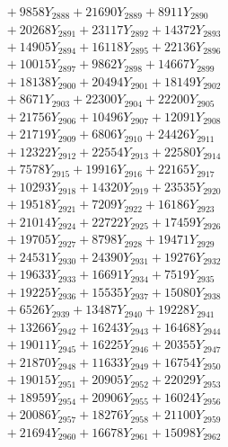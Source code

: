 \documentclass[a4paper,10pt]{article}
\begin{document}
{\begin{align}
&\;  + 9858 Y_{2888} + 21690 Y_{2889} + 8911 Y_{2890} \\[0.3ex]
&\;  + 20268 Y_{2891} + 23117 Y_{2892} + 14372 Y_{2893} \\[0.3ex]
&\;  + 14905 Y_{2894} + 16118 Y_{2895} + 22136 Y_{2896} \\[0.3ex]
&\;  + 10015 Y_{2897} + 9862 Y_{2898} + 14667 Y_{2899} \\[0.3ex]
&\;  + 18138 Y_{2900} + 20494 Y_{2901} + 18149 Y_{2902} \\[0.3ex]
&\;  + 8671 Y_{2903} + 22300 Y_{2904} + 22200 Y_{2905} \\[0.3ex]
&\;  + 21756 Y_{2906} + 10496 Y_{2907} + 12091 Y_{2908} \\[0.5ex]\allowbreak
&\;  + 21719 Y_{2909} + 6806 Y_{2910} + 24426 Y_{2911} \\[0.3ex]
&\;  + 12322 Y_{2912} + 22554 Y_{2913} + 22580 Y_{2914} \\[0.3ex]
&\;  + 7578 Y_{2915} + 19916 Y_{2916} + 22165 Y_{2917} \\[0.3ex]
&\;  + 10293 Y_{2918} + 14320 Y_{2919} + 23535 Y_{2920} \\[0.3ex]
&\;  + 19518 Y_{2921} + 7209 Y_{2922} + 16186 Y_{2923} \\[0.3ex]
&\;  + 21014 Y_{2924} + 22722 Y_{2925} + 17459 Y_{2926} \\[0.3ex]
&\;  + 19705 Y_{2927} + 8798 Y_{2928} + 19471 Y_{2929} \\[0.3ex]
&\;  + 24531 Y_{2930} + 24390 Y_{2931} + 19276 Y_{2932} \\[0.3ex]
&\;  + 19633 Y_{2933} + 16691 Y_{2934} + 7519 Y_{2935} \\[0.3ex]
&\;  + 19225 Y_{2936} + 15535 Y_{2937} + 15080 Y_{2938} \\[0.5ex]\allowbreak
&\;  + 6526 Y_{2939} + 13487 Y_{2940} + 19228 Y_{2941} \\[0.3ex]
&\;  + 13266 Y_{2942} + 16243 Y_{2943} + 16468 Y_{2944} \\[0.3ex]
&\;  + 19011 Y_{2945} + 16225 Y_{2946} + 20355 Y_{2947} \\[0.3ex]
&\;  + 21870 Y_{2948} + 11633 Y_{2949} + 16754 Y_{2950} \\[0.3ex]
&\;  + 19015 Y_{2951} + 20905 Y_{2952} + 22029 Y_{2953} \\[0.3ex]
&\;  + 18959 Y_{2954} + 20906 Y_{2955} + 16024 Y_{2956} \\[0.3ex]
&\;  + 20086 Y_{2957} + 18276 Y_{2958} + 21100 Y_{2959} \\[0.3ex]
&\;  + 21694 Y_{2960} + 16678 Y_{2961} + 15098 Y_{2962} \\[0.3ex]

\end{align}}
\end{document}
